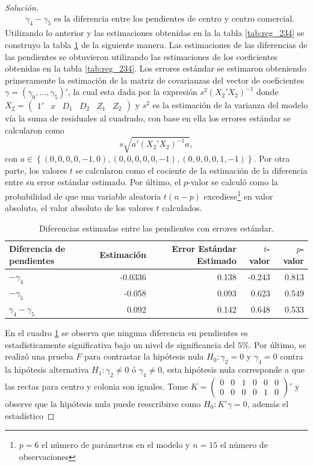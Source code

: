 \documentclass[10.5pt,notitlepage]{article}
\newenvironment{solucion}
  {\begin{proof}[Solución]}
  {\end{proof}}
\newcommand{\kis}[1]{\left\{ #1 \right\}}
\theoremstyle{plain}
\begin{document}
\begin{solucion}
\begin{align*}
    &\gamma_4 - \gamma_5 \text{ es la diferencia entre los pendientes de centro y centro comercial}.
\end{align*}
Utilizando lo anterior y las estimaciones obtenidas en la la tabla \ref{tab:reg_234} se construyo la tabla \ref{tab:dif2} de la siguiente manera. Las estimaciones de las diferencias de las pendientes se obtuvieron utilizando las estimaciones de los coeficientes obtenidas en la tabla \ref{tab:reg_234}. Los errores estándar se estimaron obteniendo primeramente la estimación de la matriz de covarianzas del vector de coeficientes \(\gamma=(\gamma_0,\hdots,\gamma_5)'\), la cual esta dada por la expresión \(s^2(X_2'X_2)^{-1}\) donde \(X_2 = \begin{pmatrix}1' & x & D_1 & D_2&Z_1&Z_2\end{pmatrix}\) y \(s^2\) es la estimación de la varianza del modelo vía la suma de residuales al cuadrado, con base en ella los errores estándar se calcularon como 
\begin{equation*}
    s\sqrt{a'(X_2'X_2)^{-1}a},
\end{equation*}
con \(a\in\kis{(0,0,0,0,-1,0),(0,0,0,0,0,-1),(0,0,0,0,1,-1)}\). Por otra parte, los valores \(t\) se calcularon como el cociente de la estimación de la diferencia entre su error estándar estimado. Por último, el \(p\)-valor se calculó como la probabilidad de que una variable aleatoria \(t(n-p)\) excediese\footnote{\(p=6\) el número de parámetros en el modelo y \(n=15\) el número de observaciones} en valor absoluto, el valor absoluto de los valores \(t\) calculados.
\begin{table}[H]
        \centering
        \begin{tabular}{@{}l@{\hskip 0.3in}r@{\hskip 0.3in}r@{\hskip 0.3in}r@{\hskip 0.3in}r@{}}
        \toprule
                    Diferencia de pendientes& Estimación & Error Estándar Estimado&\(t\)-valor& \(p\)-valor \\
            \midrule
            \(-\gamma_4\) &  -0.0336 &  0.138 &-0.243&    0.813 \\ 
            \(-\gamma_5\) &-0.058 & 0.093 &  0.623&    0.549\\ 
            \(\gamma_4-\gamma_5\) &0.092& 0.142&0.648& 0.533\\ 
            \bottomrule
        \end{tabular}
        \caption{Diferencias estimadas entre las pendientes con errores estándar.}
        \label{tab:dif2}
\end{table}
En el cuadro \ref{tab:dif2} se observa que ninguna diferencia en pendientes es estadísticamente significativa bajo un nivel de significancia del \(5\%\). Por último, se realizó una prueba \(F\) para contrastar la hipótesis nula \(H_0:\gamma_2 = 0\) y \(\gamma_4 = 0\) contra la hipótesis alternativa \(H_1:\gamma_2 \neq 0 \) ó \(\gamma_4 \neq 0\), esta hipótesis nula corresponde a que las rectas para centro y colonia son iguales. Tome \(K = \begin{pmatrix}0 & 0 & 1 & 0 & 0 &0\\0 & 0 & 0 & 0 & 1 &0 \end{pmatrix}'\) y observe que la hipótesis nula puede reescribirse como \(H_0: K'\gamma = 0\), además el estadístico 

\end{solucion}
\end{document}
